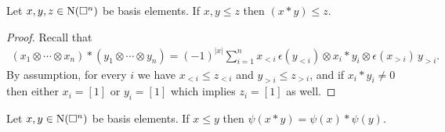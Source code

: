 
\begin{lemma}
	Let $x, y, z \in \operatorname{N}(\square^n)$ be basis elements.
	If $x, y \leq z$ then $(x \ast y) \leq z$.
\end{lemma}

\begin{proof}
	Recall that
	\begin{align*}
	(x_1 \otimes \cdots \otimes x_n) \ast (y_1 \otimes \cdots \otimes y_n) =
	(-1)^{|x|} \sum_{i=1}^n x_{<i}\, \epsilon(y_{<i}) \otimes x_i \ast y_i \otimes \epsilon(x_{>i}) \, y_{>i}.
	\end{align*}
	By assumption, for every $i$ we have $x_{<i} \leq z_{<i}$ and $y_{>i} \leq z_{>i}$, and if $x_i \ast y_i \neq 0$ then either $x_i = [1]$ or $y_i = [1]$ which implies $z_i = [1]$ as well.
\end{proof}

\begin{lemma}
	Let $x, y \in \operatorname{N}(\square^n)$ be basis elements.
	If $x \leq y$ then $\psi(x \ast y) = \psi(x) \ast \psi(y)$.
\end{lemma}

